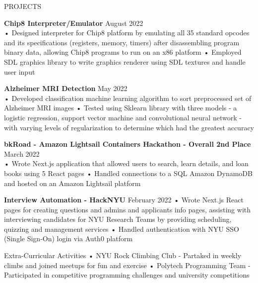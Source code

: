 \documentclass{resume} %
\begin{document}
\begin{rSection}{PROJECTS}

\textbf{Chip8 Interpreter/Emulator } \hfill August 2022 \\
• Designed interpreter for Chip8 platform by emulating all 35 standard opcodes and its specifications (registers, memory, timers) after disassembling program binary data, allowing Chip8 programs to run on an x86 platform \newline
• Employed SDL graphics library to write graphics renderer using SDL textures and handle user input \smallskip

\textbf{Alzheimer MRI Detection } \hfill May 2022 \\
• Developed classification machine learning algorithm to sort preprocessed set of Alzheimer MRI images
\newline
• Tested using Sklearn library with three models - a logistic regression, support vector machine and convolutional neural network - with varying levels of regularization to determine which had the greatest accuracy 

\textbf{bkRoad - Amazon Lightsail Containers Hackathon - Overall 2nd Place } \hfill March 2022 \\
• Wrote Next.js application that allowed users to search, learn details, and loan books using 5 React pages \newline
• Handled connections to a SQL Amazon DynamoDB and hosted on an Amazon Lightsail platform

\textbf{Interview Automation - HackNYU} \hfill February 2022 \newline
• Wrote Next.js React pages for creating questions and admins and  applicants info pages, assisting with interviewing candidates for NYU Research Teams by providing scheduling, quizzing and management services\newline
• Handled authentication with NYU SSO (Single Sign-On) login via Auth0 platform  \smallskip

\end{rSection} 

\begin{rSection}{Extra-Curricular Activities} 
• NYU Rock Climbing Club - Partaked in weekly climbs and joined meetups for fun and exercise \newline
• Polytech Programming Team - Participated in competitive programming challenges and university competitions


\end{rSection}
\end{document}
